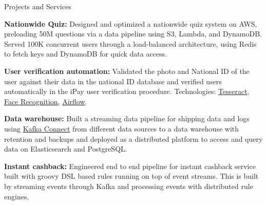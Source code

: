\begin{rSection}{Projects and Services}

\begin{rBullets}
    \item {\bf Nationwide Quiz:} Designed and optimized a nationwide quiz system on AWS, preloading 50M questions via a data pipeline using S3, Lambda, and DynamoDB. Served 100K concurrent users through a load-balanced architecture, using Redis to fetch keys and DynamoDB for quick data access.

    \item {\bf User verification automation:} Validated the photo and National ID of the user against their data in the national ID database and verified users automatically in the iPay user verification procedure. Technologies: \href{https://github.com/tesseract-ocr/tesseract}{Tesseract}, \href{https://github.com/ageitgey/face_recognition}{Face Recognition}, \href{https://github.com/apache/airflow}{Airflow}.
    
    \item {\bf Data warehouse:} Built a streaming data pipeline for shipping data and logs using \href{https://github.com/confluentinc/kafka-connect-jdbc}{Kafka Connect} from different data sources to a data warehouse with retention and backups and deployed as a distributed platform to access and query data on Elasticsearch and PostgreSQL.
    
    \item {\bf Instant cashback:} Engineered end to end pipeline for instant cashback service built with groovy DSL based rules running on top of event streams. This is built by streaming events through Kafka and processing events with distributed rule engines.

\end{rBullets}




\end{rSection}
